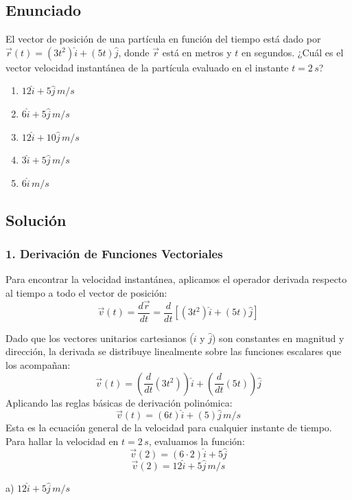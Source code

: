 \documentclass[12pt, a4paper]{article}
\begin{document}
\subsection*{Enunciado}
El vector de posición de una partícula en función del tiempo está dado por $\vec{r}(t) = (3t^2)\hat{i} + (5t)\hat{j}$, donde $\vec{r}$ está en metros y $t$ en segundos. ¿Cuál es el vector velocidad instantánea de la partícula evaluado en el instante $t = 2\,\si{s}$?
\begin{enumerate}[label=\alph*)]
    \item $12\hat{i} + 5\hat{j} \,\si{m/s}$
    \item $6\hat{i} + 5\hat{j} \,\si{m/s}$
    \item $12\hat{i} + 10\hat{j} \,\si{m/s}$
    \item $3\hat{i} + 5\hat{j} \,\si{m/s}$
    \item $6\hat{i} \,\si{m/s}$
\end{enumerate}

\subsection*{Solución}

\subsubsection*{1. Derivación de Funciones Vectoriales}
Para encontrar la velocidad instantánea, aplicamos el operador derivada respecto al tiempo a todo el vector de posición:
$$ \vec{v}(t) = \frac{d\vec{r}}{dt} = \frac{d}{dt} \left[ (3t^2)\hat{i} + (5t)\hat{j} \right] $$

Dado que los vectores unitarios cartesianos ($\hat{i}$ y $\hat{j}$) son constantes en magnitud y dirección, la derivada se distribuye linealmente sobre las funciones escalares que los acompañan:
$$ \vec{v}(t) = \left( \frac{d}{dt}(3t^2) \right) \hat{i} + \left( \frac{d}{dt}(5t) \right) \hat{j} $$
Aplicando las reglas básicas de derivación polinómica:
$$ \vec{v}(t) = (6t)\hat{i} + (5)\hat{j} \,\si{m/s} $$
Esta es la ecuación general de la velocidad para cualquier instante de tiempo. Para hallar la velocidad en $t = 2\,\si{s}$, evaluamos la función:
$$ \vec{v}(2) = (6 \cdot 2)\hat{i} + 5\hat{j} $$
$$ \vec{v}(2) = 12\hat{i} + 5\hat{j} \,\si{m/s} $$

\begin{tcolorbox}[colback=green!5!white, colframe=green!50!black, title=Respuesta Final]
\centering \Large a) $12\hat{i} + 5\hat{j} \,\si{m/s}$
\end{tcolorbox}
\end{document}
